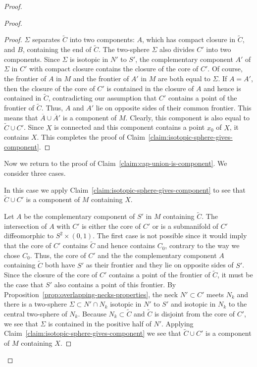 \begin{proof}
\begin{proof}
\begin{proof}
$\Sigma$ separates $\widetilde C$ into two components: $A$, which
has compact closure in $\widetilde C$, and $B$, containing the end
of $\widetilde C$. The two-sphere $\Sigma$ also divides $C'$ into
two components. Since $\Sigma$ is isotopic in $N'$ to $S'$, the
complementary component $A'$ of $\Sigma$ in $C'$ with compact
closure contains the closure of the core of $C'$. Of course, the
frontier of $A$ in $M$ and the frontier of $A'$ in $M$ are both
equal to $\Sigma$. If $A=A'$, then the closure of the core of $C'$
is contained in the closure of $A$ and hence is contained in
$\widetilde C$, contradicting our assumption that $C'$ contains a
point of the frontier of $\widetilde C$. Thus, $A$ and $A'$ lie on
opposite sides of their common frontier. This means that $\overline
A\cup \overline A'$ is a component of $M$. Clearly, this component
is also equal to $\widetilde C\cup C'$. Since $X$ is connected and
this component contains a point $x_0$ of $X$, it contains $X$. This
completes the proof of Claim~\ref{claim:isotopic-sphere-gives-component}.
 \end{proof}

Now we return to the proof of Claim~\ref{claim:cap-union-is-component}. We consider
three cases.



 In this case
we apply Claim~\ref{claim:isotopic-sphere-gives-component} to see that $\widetilde C\cup C'$ is a
component of $M$ containing $X$.


  Let $A$ be the complementary component of $S'$ in
$M$ containing $\widetilde C$. The intersection of $A$ with $C'$ is
either the core of $C'$ or is a submanifold of $C'$ diffeomorphic to
$S^2\times (0,1)$. The first case is not possible since it would
imply that the core of $C'$ contains $\widetilde C$ and hence
contains $C_0$, contrary to the way we chose $C_0$. Thus, the core
of $C'$ and the the complementary component $A$ containing
$\widetilde C$ both have $S'$ as their frontier and they lie on
opposite sides of $S'$. Since the closure of the core of $C'$
contains a point of the frontier of $\widetilde C$, it must be the
case that $S'$ also contains a point of this frontier. By
Proposition~\ref{prop:overlapping-necks-properties},  the neck $N'\subset C'$ meets
$N_{k}$ and there is a two-sphere $\Sigma\subset N'\cap N_{k}$
isotopic in $N'$ to $S'$ and isotopic in $N_{k}$ to the central
two-sphere of $N_{k}$. Because $N_{k}\subset \widetilde C$ and
$\widetilde C$ is disjoint from the core of $C'$, we see that
$\Sigma$ is contained in the positive half of $N'$. Applying
Claim~\ref{claim:isotopic-sphere-gives-component} we see that $\widetilde C\cup C'$ is a component
of $M$ containing $X$.



\end{proof}
\end{proof}
